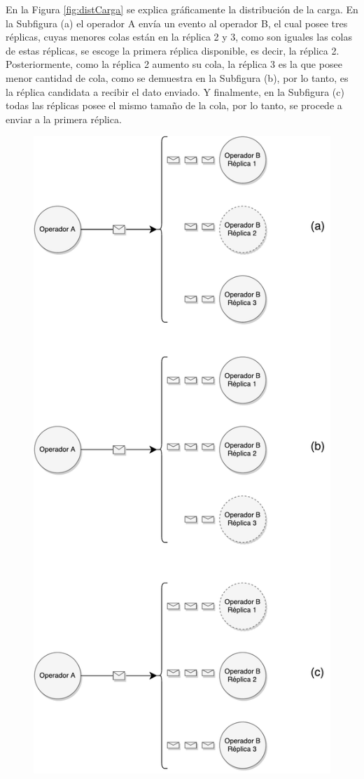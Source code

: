 En la Figura \ref{fig:distCarga} se explica gráficamente la distribución de la carga. En la Subfigura (a) el operador A envía un evento al operador B, el cual posee tres réplicas, cuyas menores colas están en la réplica 2 y 3, como son iguales las colas de estas réplicas, se escoge la primera réplica disponible, es decir, la réplica 2. Posteriormente, como la réplica 2 aumento su cola, la réplica 3 es la que posee menor cantidad de cola, como se demuestra en la Subfigura (b), por lo tanto, es la réplica candidata a recibir el dato enviado. Y finalmente, en la Subfigura (c) todas las réplicas posee el mismo tamaño de la cola, por lo tanto, se procede a enviar a la primera réplica.

\begin{figure}[!ht]
	\centering
		\includegraphics[scale=0.45]{images/DistribucionCarga.pdf}

\end{figure}
